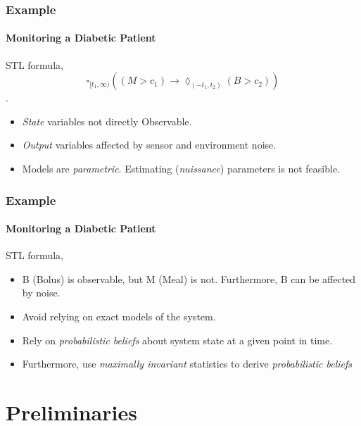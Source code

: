 \documentclass{beamer}
\newcommand{\always}[1]{\square_{#1}}
\newcommand{\eventually}[1]{\lozenge_{#1}}
\begin{document}
\begin{frame}
    \frametitle{Example}
    \framesubtitle{Monitoring a Diabetic Patient}

    STL formula, 
        $$ \always{ [ t_1, \infty )}
    \left( \left (M > c_1 \right ) \to \eventually{\left(-t_1, t_2 \right)}
    \left( B > c_2 \right ) \right)$$.
    \pause
    \begin{itemize}
        \item \textit{State} variables not directly Observable.
        \item \textit{Output} variables affected by sensor and environment noise.
        \item Models are \textit{parametric}. Estimating (\textit{nuissance}) parameters is not
            feasible.
    \end{itemize}
\end{frame}
\begin{frame}
    \frametitle{Example}
    \framesubtitle{Monitoring a Diabetic Patient}

    STL formula, 
    \begin{itemize}
        \item B (Bolus) is observable, but M (Meal) is not. Furthermore, B
            can be affected by noise.
        \pause
        \item Avoid relying on exact models of the system.
        \item Rely on \textit{probabilistic beliefs} about
            system state at a given point in time.
        \pause
        \item Furthermore, use \textit{maximally invariant} statistics
            to derive \textit{probabilistic beliefs}
    \end{itemize}
\end{frame}

\section{Preliminaries}
\end{document}
